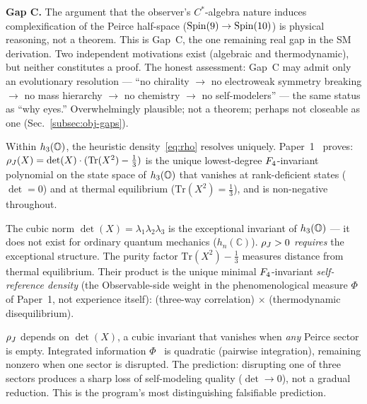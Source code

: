 \textbf{Gap C.}  The argument that the observer's $C^*$-algebra
nature induces complexification of the Peirce half-space ($\mathrm{Spin}(9)
\to \mathrm{Spin}(10)$) is physical reasoning, not a theorem.  This is Gap~C,
the one remaining real gap in the SM derivation.  Two independent
motivations exist (algebraic and thermodynamic), but neither
constitutes a proof.  The honest assessment: Gap~C may admit only an
evolutionary resolution --- ``no chirality $\to$ no electroweak
symmetry breaking $\to$ no mass hierarchy $\to$ no chemistry $\to$ no
self-modelers'' --- the same status as ``why eyes.''
Overwhelmingly plausible; not a theorem; perhaps not closeable as one
(Sec.~\ref{subsec:obj-gaps}).

\begin{claim}
\label{claim:rhoJ}\label{rem:rho-h3o}
Within $h_3(\mathbb{O})$, the heuristic density~\eqref{eq:rho} resolves
uniquely.  Paper~1~\citep{ehrlich2026measure} proves:
$\rho_J(X) = \det(X) \cdot (\mathrm{Tr}(X^2) - \tfrac{1}{3})$ is the
unique lowest-degree $F_4$-invariant polynomial on the state space
of $h_3(\mathbb{O})$ that vanishes at rank-deficient states ($\det = 0$) and
at thermal equilibrium ($\mathrm{Tr}(X^2) = \tfrac{1}{3}$), and is
non-negative throughout.
\end{claim}

The cubic norm $\det(X) = \lambda_1 \lambda_2 \lambda_3$ is the
exceptional invariant of $h_3(\mathbb{O})$ --- it does not exist for ordinary
quantum mechanics ($h_n(\mathbb{C})$).  $\rho_J > 0$ \emph{requires}
the exceptional structure.  The purity factor
$\mathrm{Tr}(X^2) - \tfrac{1}{3}$ measures distance from thermal
equilibrium.  Their product is the unique minimal $F_4$-invariant
\emph{self-reference density} (the Observable-side weight in the
phenomenological measure $\Phi$ of Paper~1, not experience itself): (three-way correlation) $\times$ (thermodynamic
disequilibrium).

\begin{remark}
\label{rem:cubic-prediction}
$\rho_J$ depends on $\det(X)$, a cubic invariant that vanishes when
\emph{any} Peirce sector is empty.  Integrated information
$\Phi$~\citep{tononi2008} is quadratic (pairwise integration),
remaining nonzero when one sector is disrupted.  The prediction:
disrupting one of three sectors produces a sharp loss of self-modeling
quality ($\det \to 0$), not a gradual reduction.  This is the
program's most distinguishing falsifiable prediction.
\end{remark}

